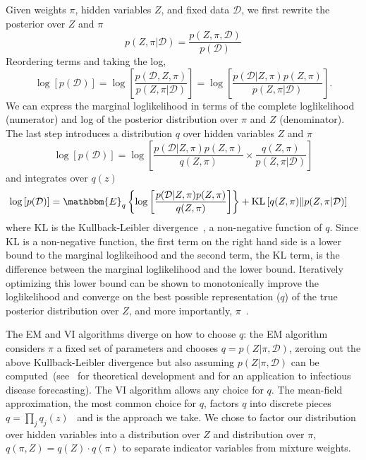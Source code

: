 \documentclass[sagev,times,Review,10pt]{sagej}
\def\l{\left}
\def\r{\right}
\newcommand{\f}{\frac}
\begin{document}
Given weights $\pi$, hidden variables $Z$, and fixed data $\mathcal{D}$, we first rewrite the posterior over $Z$ and $\pi$
\begin{equation*}
  p(Z,\pi | \mathcal{D}) = \f{ p(Z, \pi, \mathcal{D}) }{p(\mathcal{D})}
\end{equation*}
Reordering terms and taking the log,
\begin{equation*}
  \log \l[ p(\mathcal{D}) \r] = \log \l[  \f{p(\mathcal{D}, Z,  \pi)}{p(Z, \pi | \mathcal{D})}\r] = \log \l[ \f{p(\mathcal{D} | Z,\pi) p(Z,\pi) }{ p(Z,\pi | \mathcal{D})} \r] \nonumber.
\end{equation*}
We can express the marginal loglikelihood in terms of the complete loglikelihood (numerator) and log of the posterior distribution over $\pi$ and $Z$ (denominator). 
The last step introduces a distribution $q$ over hidden variables $Z$ and $\pi$
\begin{equation}
  \log \l[ p(\mathcal{D} ) \r] = \log \l[ \f{p(\mathcal{D} | Z,\pi) p(Z,\pi) }{q(Z,\pi)} \times \f{q(Z,\pi)}{ p(Z,\pi | \mathcal{D})} \r] \nonumber
\end{equation}
and integrates over $q(z)$
\begin{align}
  \log \l[ p(\mathcal{D}) \r] &= \mathbbm{E}_{q} \l\{ \log \l[ \f{p(\mathcal{D} | Z,\pi) p(Z,\pi)}{q(Z,\pi)}  \r]  \r\} + \mathrm{KL} \l[q(Z,\pi) \| p(Z,\pi| \mathcal{D}) \r] \label{twoTerms}
\end{align}
where $\mathrm{KL}$ is the Kullback-Leibler divergence~\citep{cover2012elements}, a non-negative function of $q$.
Since $\mathrm{KL}$ is a non-negative function, the first term on the right hand side is a lower bound to the marginal loglikeihood and the second term, the $\mathrm{KL}$ term, is the difference between the marginal loglikelihood and the lower bound.
Iteratively optimizing this lower bound can be shown to monotonically improve the loglikelihood and converge on the best possible representation ($q$) of the true posterior distribution over $Z$, and more importantly, $\pi$~\cite{dempster1977maximum,bishop2006pattern}.

The EM and VI algorithms diverge on how to choose $q$: the EM algorithm considers $\pi$ a fixed set of parameters and chooses $q = p(Z|\pi,\mathcal{D})$, zeroing out the above Kullback-Leibler divergence but also assuming $p(Z | \pi, \mathcal{D})$ can be computed~(see~\citep{bishop2006pattern} for theoretical development and \citep{reich2019collaborativepnas} for an application to infectious disease forecasting).
The VI algorithm allows any choice for $q$.
The mean-field approximation, the most common choice for $q$, factors $q$ into discrete pieces $q = \prod_{j}q_{j}(z)$~\citep{blei2017variational,rustagi1976variational} and is the approach we take.
We chose to factor our distribution over hidden variables into a distribution over $Z$ and distribution over $\pi$, $q(\pi,Z) = q(Z) \cdot q(\pi)$ to separate indicator variables from mixture weights.
\end{document}
